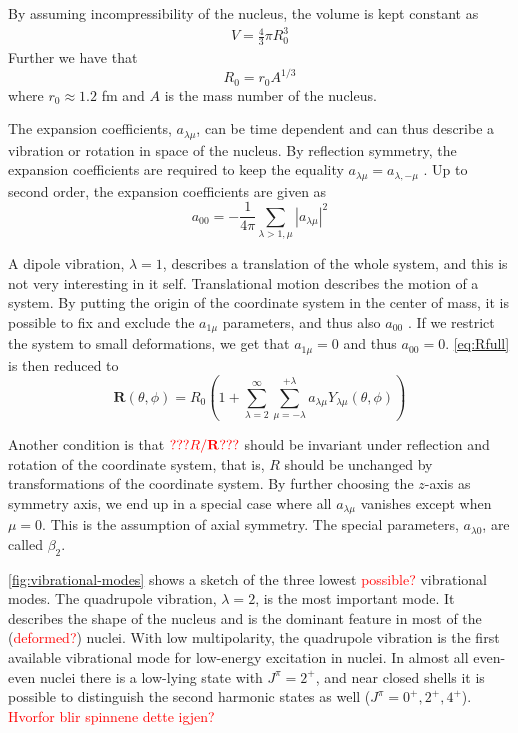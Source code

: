 \documentclass[twoside,english]{uiofysmaster/uiofysmaster}
\let\orgautoref\autoref
\renewcommand{\autoref}
        {%
		 \def\sectionautorefname{Section}%
		 \def\subsectionautorefname{Section}%
		 \def\subsubsectionautorefname{Section}%
		 \def\chapterautorefname{Chapter}%
          \orgautoref}
\begin{document}
By assuming incompressibility of the nucleus, the volume is kept constant as
\begin{align*}
	V = \frac{4}{3} \pi R_0^3
\end{align*}
Further we have that
\begin{equation}\label{eq:radius}
	R_0 = r_0 A^{1/3}
\end{equation}
where $r_0 \approx 1.2$ fm and $A$ is the mass number of the nucleus.

The expansion coefficients, $a_{\lambda \mu}$, can be time dependent and can thus describe a vibration or rotation in space of the nucleus. 
By reflection symmetry, the expansion coefficients are required to keep the equality $a_{\lambda \mu} = a_{\lambda, -\mu}$ \cite{Krane}.
Up to second order, the expansion coefficients are given as
\begin{equation}
	a_{00} = -\frac{1}{4\pi} \sum_{\lambda > 1, \mu} | a_{\lambda\mu} |^2
\end{equation}

A dipole vibration, $\lambda = 1$, describes a translation of the whole system, and this is not very interesting in it self. 
Translational motion describes the motion of a system. 
By putting the origin of the coordinate system in the center of mass, it is possible to fix and exclude the $a_{1\mu}$ parameters, and thus also $a_{00}$ \cite{RS}. 
If we restrict the system to small deformations, we get that $a_{1\mu} = 0$ and thus $a_{00} = 0$.
\autoref{eq:Rfull} is then reduced to
\begin{equation}\label{eq:Rmid}
	\mathbf{R}(\theta, \phi) = R_0 \left( 1 +  \sum^\infty_{\lambda = 2} \sum^{+\lambda}_{\mu = -\lambda} a_{\lambda \mu} Y_{\lambda \mu}(\theta, \phi) \right)
\end{equation}

Another condition is that $\textcolor{red}{??? R / \mathbf{R} ???}$ should be invariant under reflection and rotation of the coordinate system, that is, $R$ should be unchanged by transformations of the coordinate system.
By further choosing the $z$-axis as symmetry axis, we end up in a special case where all $a_{\lambda \mu}$ vanishes except when $\mu = 0$. 
This is the assumption of axial symmetry.
The special parameters, $a_{\lambda 0}$, are called $\beta_2$.

\autoref{fig:vibrational-modes} shows a sketch of the three lowest \textcolor{red}{possible?} vibrational modes. 
The quadrupole vibration, $\lambda = 2$, is the most important mode.
It describes the shape of the nucleus and is the dominant feature in most of the (\textcolor{red}{deformed?}) nuclei. 
With low multipolarity, the quadrupole vibration is the first available vibrational mode for low-energy excitation in nuclei.
In almost all even-even nuclei there is a low-lying state with $J^\pi = 2^+$, and near closed shells it is possible to distinguish the second harmonic states as well ($J^\pi = 0^+, 2^+, 4^+$). 
\textcolor{red}{Hvorfor blir spinnene dette igjen?}
\end{document}
